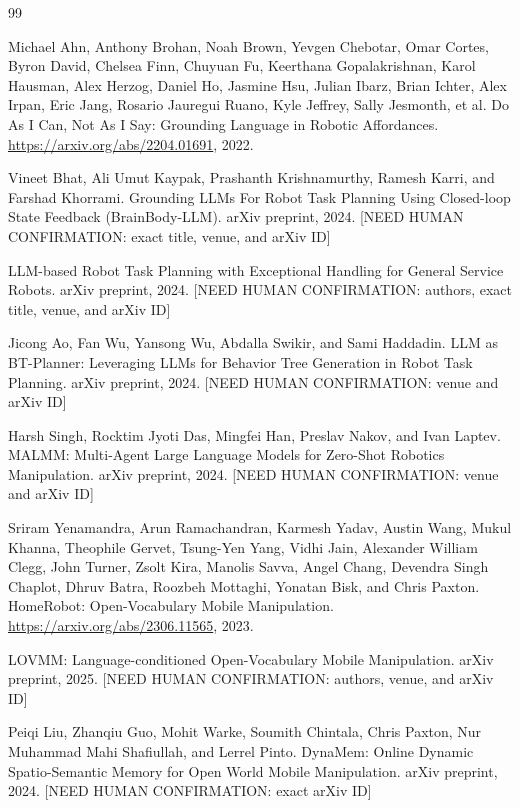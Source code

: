\documentclass[12pt,a4paper]{article}
\begin{document}
\begin{thebibliography}{99}

Michael Ahn, Anthony Brohan, Noah Brown, Yevgen Chebotar, Omar Cortes, Byron David, Chelsea Finn, Chuyuan Fu, Keerthana Gopalakrishnan, Karol Hausman, Alex Herzog, Daniel Ho, Jasmine Hsu, Julian Ibarz, Brian Ichter, Alex Irpan, Eric Jang, Rosario Jauregui Ruano, Kyle Jeffrey, Sally Jesmonth, et al.
Do As I Can, Not As I Say: Grounding Language in Robotic Affordances.
\url{https://arxiv.org/abs/2204.01691}, 2022.

Vineet Bhat, Ali Umut Kaypak, Prashanth Krishnamurthy, Ramesh Karri, and Farshad Khorrami.
Grounding LLMs For Robot Task Planning Using Closed-loop State Feedback (BrainBody-LLM).
arXiv preprint, 2024. [NEED HUMAN CONFIRMATION: exact title, venue, and arXiv ID]

LLM-based Robot Task Planning with Exceptional Handling for General Service Robots.
arXiv preprint, 2024. [NEED HUMAN CONFIRMATION: authors, exact title, venue, and arXiv ID]

Jicong Ao, Fan Wu, Yansong Wu, Abdalla Swikir, and Sami Haddadin.
LLM as BT-Planner: Leveraging LLMs for Behavior Tree Generation in Robot Task Planning.
arXiv preprint, 2024. [NEED HUMAN CONFIRMATION: venue and arXiv ID]

Harsh Singh, Rocktim Jyoti Das, Mingfei Han, Preslav Nakov, and Ivan Laptev.
MALMM: Multi-Agent Large Language Models for Zero-Shot Robotics Manipulation.
arXiv preprint, 2024. [NEED HUMAN CONFIRMATION: venue and arXiv ID]

Sriram Yenamandra, Arun Ramachandran, Karmesh Yadav, Austin Wang, Mukul Khanna, Theophile Gervet, Tsung-Yen Yang, Vidhi Jain, Alexander William Clegg, John Turner, Zsolt Kira, Manolis Savva, Angel Chang, Devendra Singh Chaplot, Dhruv Batra, Roozbeh Mottaghi, Yonatan Bisk, and Chris Paxton.
HomeRobot: Open-Vocabulary Mobile Manipulation.
\url{https://arxiv.org/abs/2306.11565}, 2023.

LOVMM: Language-conditioned Open-Vocabulary Mobile Manipulation.
arXiv preprint, 2025. [NEED HUMAN CONFIRMATION: authors, venue, and arXiv ID]

Peiqi Liu, Zhanqiu Guo, Mohit Warke, Soumith Chintala, Chris Paxton, Nur Muhammad Mahi Shafiullah, and Lerrel Pinto.
DynaMem: Online Dynamic Spatio-Semantic Memory for Open World Mobile Manipulation.
arXiv preprint, 2024. [NEED HUMAN CONFIRMATION: exact arXiv ID]


\end{thebibliography}
\end{document}
